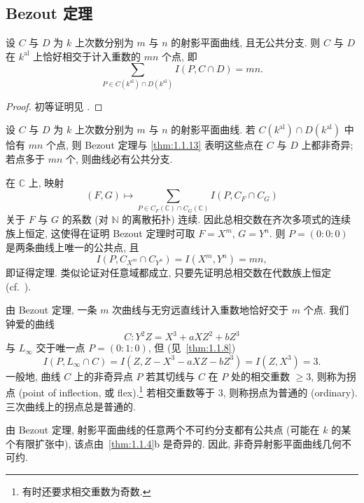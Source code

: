 \subsection*{Bezout 定理}

\begin{theorem}[Bezout] \label{thm:1.1.18} 
设 $C$ 与 $D$ 为 $k$ 上次数分别为 $m$ 与 $n$ 的射影平面曲线, 且无公共分支. 则 $C$ 与 $D$ 在 $k^{\mathrm{al}}$ 上恰好相交于计入重数的 $mn$ 个点, 即
\[
\sum_{P\in C(k^{\mathrm{al}})\cap D(k^{\mathrm{al}})} I(P, C\cap D) = mn.
\]
\end{theorem}

\begin{proof}
初等证明见 \cite[\S5.3]{fulton1969}.
\end{proof}

设 $C$ 与 $D$ 为 $k$ 上次数分别为 $m$ 与 $n$ 的射影平面曲线. 若 $C(k^{\mathrm{al}})\cap D(k^{\mathrm{al}})$ 中恰有 $mn$ 个点, 则 Bezout 定理与 \ref{thm:1.1.13} 表明这些点在 $C$ 与 $D$ 上都非奇异; 若点多于 $mn$ 个, 则曲线必有公共分支.

\begin{aside} \label{thm:1.1.19} 
在 $\mathbb{C}$ 上, 映射
\[
(F,G) \mapsto \sum_{P\in C_F(\mathbb{C})\cap C_G(\mathbb{C})} I(P, C_F\cap C_G)
\]
关于 $F$ 与 $G$ 的系数 (对 $\mathbb{N}$ 的离散拓扑) 连续. 因此总相交数在齐次多项式的连续族上恒定, 这使得在证明 Bezout 定理时可取 $F = X^m$, $G = Y^n$. 则 $P = (0:0:0)$ 是两条曲线上唯一的公共点, 且
\[
I(P, C_{X^m}\cap C_{Y^n}) = I(X^m, Y^n) = mn,
\]
即证得定理. 类似论证对任意域都成立, 只要先证明总相交数在代数族上恒定 (cf.\ \cite[III, 2.2]{shafarevich1994}).
\end{aside}

\begin{example} \label{thm:1.1.20} 
由 Bezout 定理, 一条 $m$ 次曲线与无穷远直线计入重数地恰好交于 $m$ 个点. 我们钟爱的曲线
\[
C\colon Y^2Z = X^3 + aXZ^2 + bZ^3
\]
与 $L_\infty$ 交于唯一点 $P = (0:1:0)$, 但 (见~\ref{thm:1.1.8})
\[
I(P, L_\infty\cap C) = I(Z, Z - X^3 - aXZ - bZ^3) = I(Z, X^3) = 3.
\]
一般地, 曲线 $C$ 上的非奇异点 $P$ 若其切线与 $C$ 在 $P$ 处的相交重数 $\ge 3$, 则称为拐点 (point of inflection, 或 flex).\footnote{有时还要求相交重数为奇数.} 若相交重数等于 $3$, 则称拐点为普通的 (ordinary). 三次曲线上的拐点总是普通的.
\end{example}

\begin{remark} \label{thm:1.1.21} 
由 Bezout 定理, 射影平面曲线的任意两个不可约分支都有公共点 (可能在 $k$ 的某个有限扩张中), 该点由~\ref{thm:1.1.4}b 是奇异的. 因此, 非奇异射影平面曲线几何不可约.
\end{remark}

